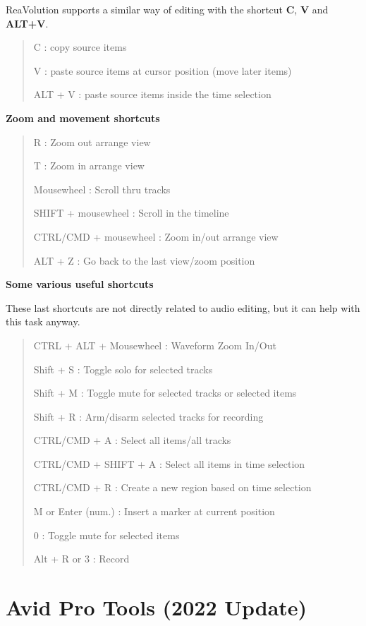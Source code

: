 \documentclass[
  letterpaper,
  DIV=11,
  numbers=noendperiod]{scrreport}
\begin{document}
ReaVolution supports a similar way of editing with the shortcut
\textbf{C}, \textbf{V} and \textbf{ALT+V}.

\begin{quote}
C : copy source items

V : paste source items at cursor position (move later items)

ALT + V : paste source items inside the time selection
\end{quote}

\textbf{Zoom and movement shortcuts}

\begin{quote}
R : Zoom out arrange view

T : Zoom in arrange view

Mousewheel : Scroll thru tracks

SHIFT + mousewheel : Scroll in the timeline

CTRL/CMD + mousewheel : Zoom in/out arrange view

ALT + Z : Go back to the last view/zoom position
\end{quote}

\textbf{Some various useful shortcuts}

These last shortcuts are not directly related to audio editing, but it
can help with this task anyway.

\begin{quote}
CTRL + ALT + Mousewheel : Waveform Zoom In/Out

Shift + S : Toggle solo for selected tracks

Shift + M : Toggle mute for selected tracks or selected items

Shift + R : Arm/disarm selected tracks for recording

CTRL/CMD + A : Select all items/all tracks

CTRL/CMD + SHIFT + A : Select all items in time selection

CTRL/CMD + R : Create a new region based on time selection

M or Enter (num.) : Insert a marker at current position

0 : Toggle mute for selected items

Alt + R or 3 : Record
\end{quote}

\hypertarget{avid-pro-tools-2022-update}{%
\chapter{Avid Pro Tools (2022
Update)}\label{avid-pro-tools-2022-update}}
\end{document}
